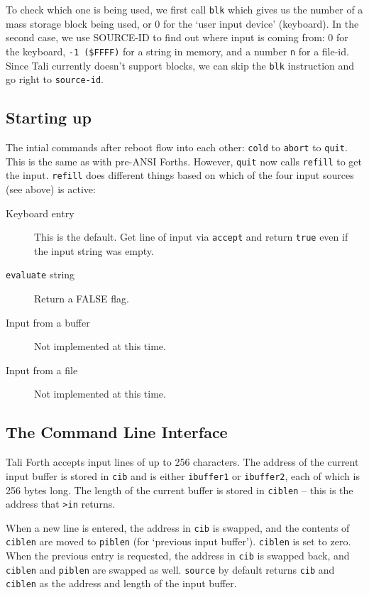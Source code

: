 To check which one is being used, we first call \texttt{blk} which gives us the
number of a mass storage block being used, or 0 for the `user input device'
(keyboard). In the second case, we use SOURCE-ID to find out where input is
coming from: 0 for the keyboard, \texttt{-1 (\$FFFF)} for a string in memory,
and a number \texttt{n} for a file-id. Since Tali currently doesn't support
blocks, we can skip the \texttt{blk} instruction and go right to \texttt{source-id}. 


\subsection{Starting up}

The intial commands after reboot flow into each other: \texttt{cold} to
\texttt{abort} to \texttt{quit}. This is the same as with pre-ANSI Forths.
However, \texttt{quit} now calls \texttt{refill} to get the input.
\texttt{refill} does different things based on which of the four input sources
(see above) is active: 

\begin{description} 
        \item [Keyboard entry] This is the default. Get line of input via
                \texttt{accept} and return \texttt{true} even if the input string was
                empty.
        \item [\texttt{evaluate} string] Return a FALSE flag.
        \item [Input from a buffer] Not implemented at this time.
        \item [Input from a file] Not implemented at this time.
\end{description}


\subsection{The Command Line Interface}

Tali Forth accepts input lines of up to 256 characters. The address of the
current input buffer is stored in \texttt{cib} and is either \texttt{ibuffer1}
or \texttt{ibuffer2}, each of which is 256 bytes long. The length of the current
buffer is stored in \texttt{ciblen} -- this is the address that \texttt{>in}
returns. 

When a new line is entered, the address in \texttt{cib} is swapped, and the
contents of \texttt{ciblen} are moved to \texttt{piblen} (for `previous input
buffer'). \texttt{ciblen} is set to zero.  When the previous entry is
requested, the address in \texttt{cib} is swapped back, and \texttt{ciblen} and
\texttt{piblen} are swapped as well. \texttt{source} by default returns
\texttt{cib} and \texttt{ciblen} as the address and length of the input buffer. 

